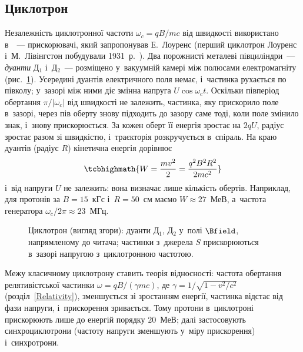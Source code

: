 \subsection*{Циклотрон}


Незалежність циклотронної частоти $\omega_c = qB/mc$ від швидкості використано в~~--- прискорювачі,
який запропонував Е.~Лоуренс (перший циклотрон Лоуренс і~М.~Лівінгстон побудували 1931~р.~\cite{LawrenceLivingston1932}). Два порожнисті металеві півциліндри~---
\emph{дуанти} Д$_1$ і~Д$_2$~--- розміщено у~вакуумній камері між полюсами електромагніту (рис.~\ref{tikz:cyclotron_accel}). Усередині
дуантів електричного поля немає, і~частинка рухається по півколу; у~зазорі між ними діє змінна напруга $U\cos\omega_c t$. Оскільки
півперіод обертання $\pi/|\omega_c|$ від швидкості не залежить, частинка, яку прискорило поле в~зазорі, через пів оберту знову підходить
до зазору саме тоді, коли поле змінило знак, і~знову прискорюється. За кожен оберт її енергія зростає на $2qU$, радіус зростає разом зі
швидкістю, і~траєкторія розкручується в~спіраль. На краю дуантів (радіус $R$) кінетична енергія дорівнює
\begin{equation}\label{eq:cyclotron_energy}
	\tcbhighmath{
		W = \frac{mv^2}{2} = \frac{q^2B^2R^2}{2mc^2}
	}
\end{equation}
і~від напруги $U$ не залежить: вона визначає лише кількість обертів. Наприклад, для протонів за $B=15$~кГс і~$R=50$~см маємо
$W\approx27$~МеВ, а~частота генератора $\omega_c/2\pi\approx23$~МГц.

\begin{figure}[h!]
	\centering
	\caption{Циклотрон (вигляд згори): дуанти Д$_1$, Д$_2$ у~полі $\Bfield$, напрямленому до читача; частинки з~джерела $S$ прискорюються
		в~зазорі напругою з~циклотронною частотою.}
	\label{tikz:cyclotron_accel}
\end{figure}

Межу класичному циклотрону ставить теорія відносності: частота обертання релятивістської частинки $\omega = qB/(\gamma mc)$, де
$\gamma = 1/\sqrt{1-v^2/c^2}$ (розділ~\ref{Relativity}), зменшується зі зростанням енергії, частинка відстає від фази напруги, і~прискорення
зривається. Тому протони в~циклотроні прискорюють лише до енергій порядку $20$~МеВ; далі застосовують синхроциклотрони (частоту напруги
зменшують у~міру прискорення) і~синхротрони.


